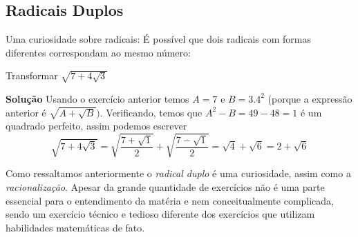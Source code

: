 \subsection{Radicais Duplos} 
Uma curiosidade sobre radicais: É possível que dois radicais com formas diferentes correspondam ao mesmo número:
\begin{exeresol}[EPCAR] Transformar $\sqrt{7+4\sqrt{3}}$


 \textbf{Solução} Usando o exercício anterior temos $A=7$ e $B=3.4^2$ (porque a expressão anterior é $\sqrt{A+\sqrt{B}})$. Verificando, temos que $A^2-B = 49-48=1$ é um quadrado perfeito, assim podemos escrever $$\sqrt{7+4\sqrt{3}}= \sqrt{\frac{7+\sqrt{1}}{2}} + \sqrt{\frac{7-\sqrt{1}}{2}}=\sqrt{4} + \sqrt{6} = 2 + \sqrt{6}$$
\end{exeresol}

Como ressaltamos anteriormente o \textit{radical duplo} é uma curiosidade, assim como a \textit{racionalização}. Apesar da grande quantidade de exercícios não é uma parte essencial para o entendimento da matéria e nem conceitualmente complicada, sendo um exercício técnico e tedioso diferente dos exercícios que utilizam habilidades matemáticas de fato.

